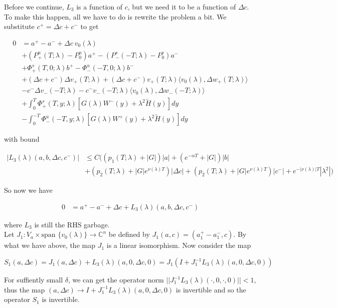 \documentclass[12pt]{article}
\def\C{{\mathbb C}}
\begin{document}
\begin{enumerate}
Before we continue, $L_3$ is a function of $c$, but we need it to be a function of $\Delta c$. To make this happen, all we have to do is rewrite the problem a bit. We substitute $c^+ = \Delta c + c^-$ to get

\begin{align*}
0 &= a^+ - a^- + \Delta c \: v_0(\lambda) \\
&+ (P^u_+(T; \lambda) - P_0^u)a^+ - (P^s_-(-T; \lambda) - P_0^s)a^- \\
&+ \Phi^s_+(T, 0; \lambda)b^+ - \Phi^u_-(-T, 0; \lambda)b^- \\
&+ (\Delta c + c^-) \Delta v_+(T; \lambda) + (\Delta c + c^-) v_+(T; \lambda) \langle v_0(\lambda), \Delta w_+(T; \lambda) \rangle \\
&- c^- \Delta v_-(-T; \lambda) - c^- v_-(-T; \lambda) \langle v_0(\lambda), \Delta w_-(-T; \lambda) \rangle \\
&+ \int_0^T \Phi^s_+(T, y; \lambda) [ G(\lambda)W^-(y) + \lambda^2 \tilde{H}(y) ] dy \\
&- \int_0^{-T} \Phi^u_-(-T, y; \lambda) [ G(\lambda)W^+(y) + \lambda^2 \tilde{H}(y) ] dy
\end{align*}

with bound

\begin{align*}
|L_3(\lambda)(a, b, \Delta c, c^-)| &\leq C ( (p_1(T; \lambda) + |G|)|a| + (e^{-\alpha T} + |G|)|b| \\
&+ ( p_2(T; \lambda) + |G|e^{\nu(\lambda)T})|\Delta c| + ( p_2(T; \lambda) + |G|e^{\nu(\lambda)T})|c^-|+ e^{-|\nu(\lambda)|T} |\lambda^2| )
\end{align*}

So now we have 

\begin{align*}
0 &= a^+ - a^- + \Delta c + L_3(\lambda)(a, b, \Delta c, c^-)
\end{align*}

where $L_3$ is still the RHS garbage.\\

Let $J_1: V_a \times \text{span }\{v_0(\lambda)\} \rightarrow \C^n$ be defined by $J_1(a, c) = (a_1^+ - a_1^-, c)$. By what we have above, the map $J_1$ is a linear isomorphism. Now consider the map

\[
S_1(a, \Delta c) = J_1 (a, \Delta c) + L_3(\lambda)(a, 0, \Delta c, 0) = J_1( I + J_1^{-1} L_3(\lambda)(a, 0, \Delta c, 0) )
\]


For suffiently small $\delta$, we can get the operator norm $||J_1^{-1} L_3(\lambda)(\cdot, 0, \cdot, 0)|| < 1$, thus the map $(a, \Delta c) \rightarrow I + J_1^{-1} L_3(\lambda)(a, 0, \Delta c, 0)$ is invertible and so the operator $S_1$ is invertible.\\


\end{enumerate}
\end{document}
